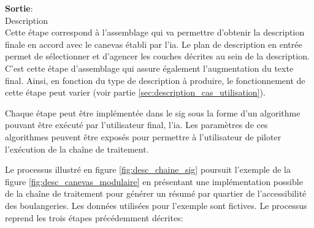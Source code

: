 \begin{enumerate}
        \textbf{Sortie}:\\
        \hspace*{1cm}Description\\
        Cette étape correspond à l’assemblage qui va permettre d'obtenir la description finale en accord avec le canevas établi par l’\gls{ia}. Le plan de description en entrée permet de sélectionner et d’agencer les couches décrites au sein de la description. C'est cette étape d'assemblage qui assure également l'augmentation du texte final. Ainsi, en fonction du type de description à produire, le fonctionnement de cette étape peut varier (voir partie \ref{sec:description_cas_utilisation}).
\end{enumerate}

Chaque étape peut être implémentée dans le \gls{sig} sous la forme d’un algorithme pouvant être exécuté par l'utilisateur final, l'\gls{ia}. Les paramètres de ces algorithmes peuvent être exposés pour permettre à l’utilisateur de piloter l’exécution de la chaîne de traitement.

\newpar{}

Le processus illustré en figure \ref{fig:desc_chaine_sig} poursuit l'exemple de la figure \ref{fig:desc_canevas_modulaire} en présentant une implémentation possible de la chaîne de traitement pour générer un résumé par quartier de l'accessibilité des boulangeries. Les données utilisées pour l'exemple sont fictives. Le processus reprend les trois étapes précédemment décrites:

